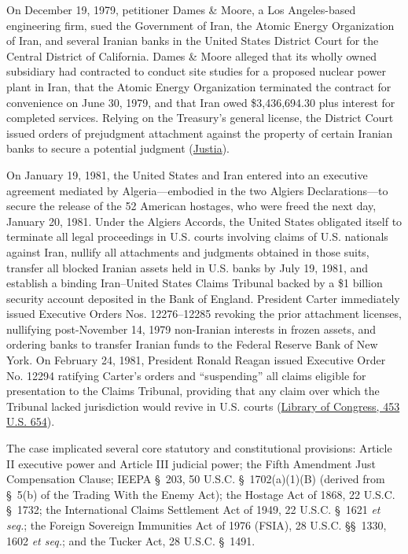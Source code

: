 \documentclass[12pt]{article}
\begin{document}
On December 19, 1979, petitioner Dames \& Moore, a Los Angeles-based engineering firm, sued the Government of Iran, the Atomic Energy Organization of Iran, and several Iranian banks in the United States District Court for the Central District of California. Dames \& Moore alleged that its wholly owned subsidiary had contracted to conduct site studies for a proposed nuclear power plant in Iran, that the Atomic Energy Organization terminated the contract for convenience on June 30, 1979, and that Iran owed \$3,436,694.30 plus interest for completed services. Relying on the Treasury's general license, the District Court issued orders of prejudgment attachment against the property of certain Iranian banks to secure a potential judgment (\href{https://supreme.justia.com/cases/federal/us/453/654/}{Justia}).

On January 19, 1981, the United States and Iran entered into an executive agreement mediated by Algeria---embodied in the two Algiers Declarations---to secure the release of the 52 American hostages, who were freed the next day, January 20, 1981. Under the Algiers Accords, the United States obligated itself to terminate all legal proceedings in U.S. courts involving claims of U.S. nationals against Iran, nullify all attachments and judgments obtained in those suits, transfer all blocked Iranian assets held in U.S. banks by July 19, 1981, and establish a binding Iran--United States Claims Tribunal backed by a \$1 billion security account deposited in the Bank of England. President Carter immediately issued Executive Orders Nos. 12276--12285 revoking the prior attachment licenses, nullifying post-November 14, 1979 non-Iranian interests in frozen assets, and ordering banks to transfer Iranian funds to the Federal Reserve Bank of New York. On February 24, 1981, President Ronald Reagan issued Executive Order No. 12294 ratifying Carter's orders and ``suspending'' all claims eligible for presentation to the Claims Tribunal, providing that any claim over which the Tribunal lacked jurisdiction would revive in U.S. courts (\href{https://tile.loc.gov/storage-services/service/ll/usrep/usrep453/usrep453654/usrep453654.pdf}{Library of Congress, 453 U.S. 654}).

The case implicated several core statutory and constitutional provisions: Article II executive power and Article III judicial power; the Fifth Amendment Just Compensation Clause; IEEPA \S\ 203, 50 U.S.C. \S\ 1702(a)(1)(B) (derived from \S\ 5(b) of the Trading With the Enemy Act); the Hostage Act of 1868, 22 U.S.C. \S\ 1732; the International Claims Settlement Act of 1949, 22 U.S.C. \S\ 1621 \textit{et seq.}; the Foreign Sovereign Immunities Act of 1976 (FSIA), 28 U.S.C. \S\S\ 1330, 1602 \textit{et seq.}; and the Tucker Act, 28 U.S.C. \S\ 1491.
\end{document}
